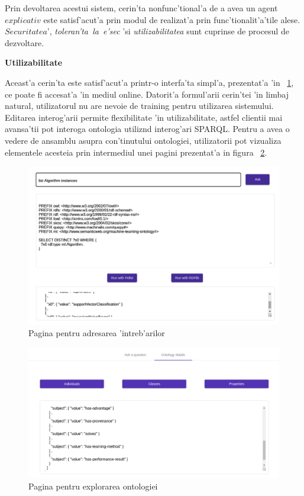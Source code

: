 \documentclass[12pt,a4paper,twoside]{report}
\begin{document}
Prin devoltarea acestui sistem, cerin'ta nonfunc'tional'a de a avea un agent $explicativ$ este satisf'acut'a prin modul de realizat'a prin func'tionalit'a'tile alese. $Securitatea$', {\it toleran'ta\ la\ e'sec} 'si {\it utilizabilitatea} sunt cuprinse de procesul de dezvoltare.


{\bf Utilizabilitate}

Aceast'a cerin'ta este satisf'acut'a printr-o interfa'ta simpl'a, prezentat'a 'in ~\ref{fig:ui1}, ce poate fi accesat'a 'in mediul online. Datorit'a formul'arii cerin'tei 'in limbaj natural, utilizatorul nu are nevoie de training pentru utilizarea sistemului. Editarea interog'arii permite flexibilitate 'in utilizabilitate, astfel clientii mai avansa'tii pot interoga ontologia utiliz\ia nd interog'ari SPARQL. Pentru a avea o vedere de ansamblu asupra con'tinutului ontologiei, utilizatorii pot vizualiza elementele acesteia prin intermediul unei pagini prezentat'a in figura ~\ref{fig:ui2}.


\begin{figure}
    \centering
    \includegraphics[width = 0.65 \linewidth]{img/pg1_cut.png}
        \caption{Pagina pentru adresarea 'intreb'arilor}
    \label{fig:ui1}
\end{figure}

\begin{figure}
    \centering
    \includegraphics[width = 0.65 \linewidth]{img/ui2.png}
        \caption{Pagina pentru explorarea ontologiei}
    \label{fig:ui2}
\end{figure}
\end{document}
